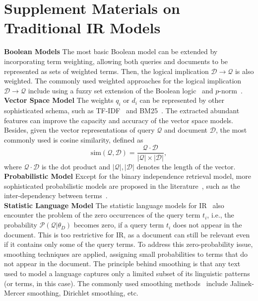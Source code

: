 
\onecolumn
\label{appendix}

\section{Supplement Materials on Traditional IR Models}
\label{appendix:traditional}
\noindent \textbf{Boolean Models} 
The most basic Boolean model can be extended by incorporating term weighting, allowing both queries and documents to be represented as sets of weighted terms. Then, the logical implication $\mathcal{D} \rightarrow \mathcal{Q}$ is also weighted.
The commonly used weighted approaches for the logical implication $\mathcal{D} \rightarrow \mathcal{Q}$ include using a fuzzy set extension of the Boolean logic~\cite{radecki1979fuzzy,kraft1983fuzzy} and $p$-norm~\cite{salton1983extended}. \\

\noindent \textbf{Vector Space Model} 
The weights $q_i$ or $d_i$ can be represented by other sophisticated schema, such as TF-IDF~\cite{sparck1972statistical} and BM25~\cite{robertson1995okapi}. The extracted abundant features can improve the capacity and accuracy of the vector space models.
Besides, given the vector representations of query $\mathcal{Q}$ and document $\mathcal{D}$, the most commonly used is cosine similarity, defined as
$$
\text{sim}(\mathcal{Q},\mathcal{D}) = \frac{\mathcal{Q}\cdot\mathcal{D}}{|\mathcal{Q}|\times|\mathcal{D}|}, 
$$
where $\mathcal{Q}\cdot\mathcal{D}$ is the dot product and  $|\mathcal{Q}|,|\mathcal{D}|$ denotes the length of the vector. \\

\noindent \textbf{Probabilistic Model} 
Except for the binary independence retrieval model, more sophisticated probabilistic models are proposed in the literature~\cite{wong1989probability,fuhr1992probabilistic}, such as the inter-dependency between terms~\cite{van1979information}.\\

\noindent \textbf{Statistic Language Model} 
The statistic language models for IR~\cite{miller1999hidden,berger1999information,song1999general} also encounter the problem of the zero occurrences of the query term $t_i$, i.e., the probability $\mathcal{P}(\mathcal{Q}|\theta_{D})$ becomes zero, if a query term $t_i$ does not appear in the document. This is too restrictive for IR, as a document can still be relevant even if it contains only some of the query terms. To address this zero-probability issue, smoothing techniques are applied, assigning small probabilities to terms that do not appear in the document. The principle behind smoothing is that any text used to model a language captures only a limited subset of its linguistic patterns (or terms, in this case).
The commonly used smoothing methods~\cite{zhai2004study,zhai2008statistical} include Jalinek-Mercer smoothing, Dirichlet smoothing, etc.

